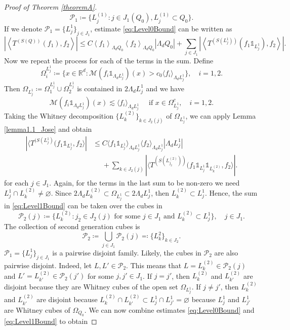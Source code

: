 \documentclass[12pt]{amsart}
\newcommand{\R}{\mathbb{R}}
\newcommand{\one}{\mathds{1}}
\theoremstyle{plain}
\theoremstyle{definition} %
\numberwithin{equation}{section}
\begin{document}
\begin{proof}[Proof of Theorem \ref{theoremA}]
    \[
    \mathcal{P}_1
    \coloneqq
    \{L_j^{(1)}: j\in J_1(Q_0), L_j^{(1)}\subset Q_0\}.
    \]
    If we denote $\mathcal{P}_1=\{L_j^1\}_{j\in J_1}$, estimate \eqref{eq:Level0Bound} can be written as
    \[
    \left|\left\langle T^{(S(Q))} (f_1), f_2\right\rangle\right|
    \leq
    C\left\langle f_1\right\rangle_{\Lambda_dQ_0}\left\langle f_2\right\rangle_{\Lambda_dQ_0}|\Lambda_dQ_0|
    +
    \sum_{j\in J_1}\left|\left\langle T^{(S(L_j^{1}))} (f_1 \one_{L_j^{1}}), f_2\right\rangle\right|.
    \]
    Now we repeat the process for each of the terms in the sum. Define
    \[
    \Omega_{i}^{L_{j}^{1}}
    \coloneqq 
    \{
    x\in\R^d: \mathcal{M}(f_i\mathds{1}_{\Lambda_d L_j^{1}})(x)
    >
    c_0\langle f_i\rangle_{\Lambda_d L_j^{1}}\},\quad i=1,2.
    \]
    Then $\Omega_{L_j^{1}}\coloneqq \Omega_{1}^{L_{j}^{1}}\cup \Omega_{2}^{L_{j}^{1}}$ is contained in $2\Lambda_d L_j^{1}$ and we have
    \[
    \mathcal{M}(f_i\mathds{1}_{\Lambda_d L_j^{1}})(x)
    \lesssim 
    \langle f_i\rangle_{\Lambda_d L_j^{1}} \quad \text{ if }x\in\Omega_{L_j^1}^{c}, \quad i=1,2.
    \]
    Taking the Whitney decomposition $\{L_{k}^{(2)}\}_{k\in J_2(j)}$ of $\Omega_{L_j^{1}}$, we can apply Lemma \ref{lemma1.1_Jose} and obtain 
    \begin{align}\label{eq:Level1Bound}
        \nonumber|\langle T^{(S(L_j^{1})}(f_1\mathds{1}_{L_j^{1}},f_2\rangle |
        &\leq 
        C\langle f_1\mathds{1}_{L_j^{1}}\rangle_{\Lambda_d L_j^{1}}\langle f_2\rangle_{\Lambda_d L_j^{1}}|\Lambda_d L_j^{1}|
        \\&\phantom{=}+
        \sum_{k\in J_2(j)}|\langle T^{(S(L_{j_2}^{(2)}))}(f_1\mathds{1}_{L_j^{1}}\mathds{1}_{L_{k}^{(2)}},f_2\rangle|.
    \end{align}
    for each $j\in J_1$. Again, for the terms in the last sum to be non-zero we need $L_j^{1}\cap L_{k}^{(2)}\neq \varnothing$. Since $2\Lambda_dL_{k}^{(2)}\subset \Omega_{L_j^{1}}\subset 2\Lambda_d L_j^{1}$, then $L_{k}^{(2)}\subset L_j^{1}$. Hence, the sum in \eqref{eq:Level1Bound} can be taken over the cubes in 
    \[
    \mathcal{P}_{2}(j)
    \coloneqq 
    \{L_{k}^{(2)}: j_2\in J_2(j) \text{ for some }j\in J_1 \text{ and }L_{k}^{(2)}\subset L_j^{1}\}, \quad j\in J_1.
    \]
    The collection of second generation cubes is
    \[
    \mathcal{P}_2
    \coloneqq 
    \bigcup_{j\in J_1}\mathcal{P}_2(j)
    \eqqcolon 
    \{L_k^{2}\}_{k\in J_2}.
    \]
$\mathcal{P}_1=\{L_j^{1}\}_{j\in J_1}$ is a pairwise disjoint family. Likely, the cubes in $\mathcal{P}_2$ are also pairwise disjoint. Indeed, let $L,L'\in \mathcal{P}_2$. This means that $L=L_k^{(2)}\in \mathcal{P}_2(j)$ and $L'=L_{k'}^{(2)}\in\mathcal{P}_2(j')$ for some $j,j'\in J_1$. If $j=j'$, then $L_k^{(2)}$ and $L_{k'}^{(2)}$ are disjoint because they are Whitney cubes of the open set $\Omega_{L_j^1}$. If $j\neq j'$, then $L_k^{(2)}$ and $L_{k'}^{(2)}$ are disjoint because $L_k^{(2)}\cap L_{k'}^{(2)}\subset L_{j}^1\cap L_{j'}^1=\varnothing$ because $L_j^{1}$ and $L_{j'}^{1}$ are Whitney cubes of $\Omega_{Q_0}$. We can now combine estimates \eqref{eq:Level0Bound} and \eqref{eq:Level1Bound} to obtain

\end{proof}
\end{document}
